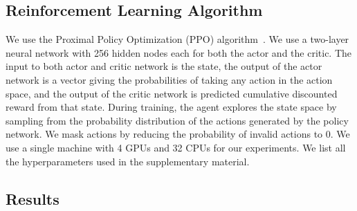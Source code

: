 \documentclass[letterpaper]{article} %
\begin{document}
\subsection{Reinforcement Learning Algorithm}
We use the Proximal Policy Optimization (PPO) algorithm~\cite{schulman2017proximal}. %
We use a two-layer neural network with 256 hidden nodes each for both the actor and the critic. The input to both actor and critic network is the state, the output of the actor network is a vector giving the probabilities of taking any action in the action space, and the output of the critic network is predicted cumulative discounted reward from that state. During training, the agent explores the state space by sampling from the probability distribution of the actions generated by the policy network. We mask actions by reducing the probability of invalid actions to 0. We use a single machine with 4 GPUs and 32 CPUs for our experiments. We list all the hyperparameters used in the supplementary material.




\subsection{Results}
\end{document}
